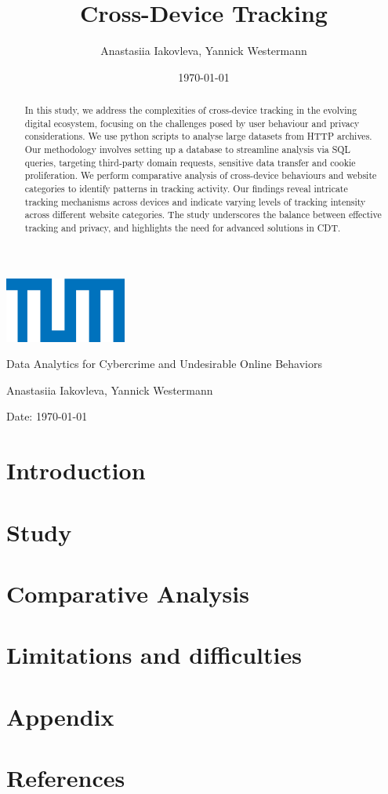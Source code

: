 \documentclass{article}
\title{Cross-Device Tracking}
\author{Anastasiia Iakovleva, Yannick Westermann}
\date{\today}
\renewcommand\maketitle{
  \begin{titlepage}
    \centering
    \includegraphics[width=0.3\textwidth]{./assets/tum-logo.png} 
    \vspace{1cm}

    \Large
    Data Analytics for Cybercrime and Undesirable Online Behaviors
    \vspace{2cm}

    \Huge
    \thetitle{}
    \vspace{2cm}

    \Large
    Anastasiia Iakovleva, Yannick Westermann
    \vspace{1cm}

    \normalsize
    Date: \today
    \vspace{1cm}

    \begin{abstract}
      In this study, we address the complexities of cross-device tracking in the evolving digital ecosystem, focusing on the challenges posed by user behaviour and privacy considerations. We use python scripts to analyse large datasets from HTTP archives. Our methodology involves setting up a database to streamline analysis via SQL queries, targeting third-party domain requests, sensitive data transfer and cookie proliferation. We perform comparative analysis of cross-device behaviours and website categories to identify patterns in tracking activity. Our findings reveal intricate tracking mechanisms across devices and indicate varying levels of tracking intensity across different website categories. The study underscores the balance between effective tracking and privacy, and highlights the need for advanced solutions in CDT.
    \end{abstract}
  \end{titlepage}
}
\begin{document}
\maketitle

\newpage
\tableofcontents
\newpage

\section{Introduction}\label{sec:introduction}


\section{Study}\label{sec:methodology}


\section{Comparative Analysis}\label{sec:results}


\section{Limitations and difficulties}\label{sec:conclusion}


\newpage

\section{Appendix}\label{sec:attachments}


\section{References}\label{sec:references}
\printbibliography[heading=none]
\end{document}
